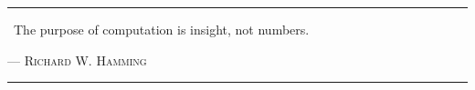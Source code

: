 \vspace*{3pc}
\begin{center}
\begin{minipage}{0.7\linewidth}
\hrule
\vspace{8pt}
{\huge\guillemotleft} ~The purpose of computation is insight, not numbers. {\huge\guillemotright}  \\
\vspace{2pt}
\begin{flushright}
--- \textsc{Richard W. Hamming}
\end{flushright}
\vspace{8pt}
\hrule
\end{minipage}
\end{center}
\vspace{3pc}



